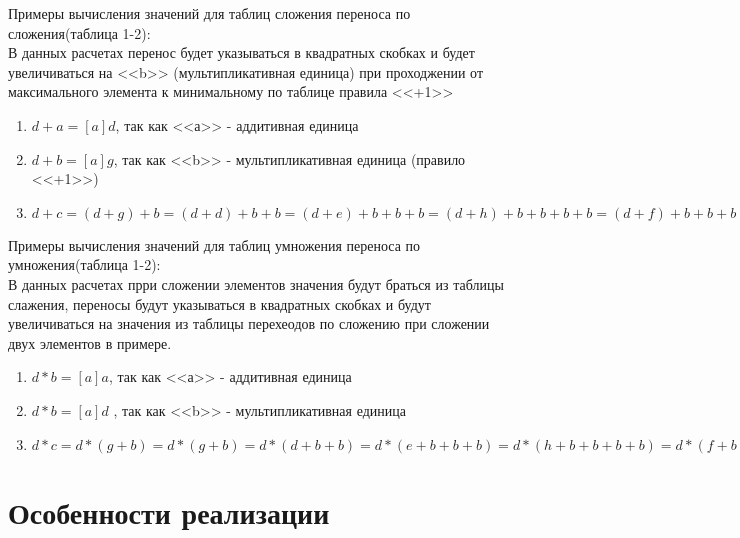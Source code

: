 \documentclass[10pt,a4paper,final]{article} %
\begin{document}
	Примеры вычисления значений для таблиц сложения переноса по сложения(таблица 1-2):\\
		В данных расчетах перенос будет указываться в квадратных скобках и будет увеличиваться на <<b>> (мультипликативная единица) при проходжении от максимального элемента к минимальному по таблице правила <<+1>>
		\begin{enumerate}[itemsep=0pt,parsep=0pt,topsep=0pt,partopsep=0pt,label=\textbullet]
		
			\item $d+a=[a]d$, так как <<а>> - аддитивная единица
			\item $d+b=[a]g$, так как <<b>> - мультипликативная единица (правило <<+1>>)
			\item $d+c=(d+g)+b=(d+d)+b+b=(d+e)+b+b+b=(d+h)+b+b+b+b=(d+f)+b+b+b+b+b=(d+b)+b+b+b+b+b+b=
		[a](g+b)+b+b+b+b+b=[a](c+b)+b+b+b+b=[b](a+b)+b+b+b=[b](b+b)+b+b=[b](f+b)+b=h+b=e$
		\end{enumerate}
		
	Примеры вычисления значений для таблиц умножения переноса по умножения(таблица 1-2):\\
			В данных расчетах прри сложении элементов значения будут браться из таблицы слажения, переносы будут указываться в квадратных скобках и будут увеличиваться на значения из таблицы перехеодов по сложению при сложении двух элементов в примере.
	
	\begin{enumerate}[itemsep=0pt,parsep=0pt,topsep=0pt,partopsep=0pt,label=\textbullet]
	
		\item $d*b=[a]a$, так как <<а>> - аддитивная единица
		\item $d*b=[a]d$ , так как <<b>> - мультипликативная единица
		\item $d*c=d*(g+b)=
		d*(g+b)=d*(d+b+b)=d*(e+b+b+b)=d*(h+b+b+b+b)=d*(f+b+b+b+b+b)=d*(b+b+b+b+b+b+b)=(d+d)+d+d+d+d+d=
		[b](f+d)+d+d+d+d=[b](c+d)+d+d+d=[f](e+d)+d+d=[h](b+d)+d=[h]g+d=[e]h.$
		
	\end{enumerate}
	
	\newpage
	
	\section{Особенности реализации}
\end{document}
